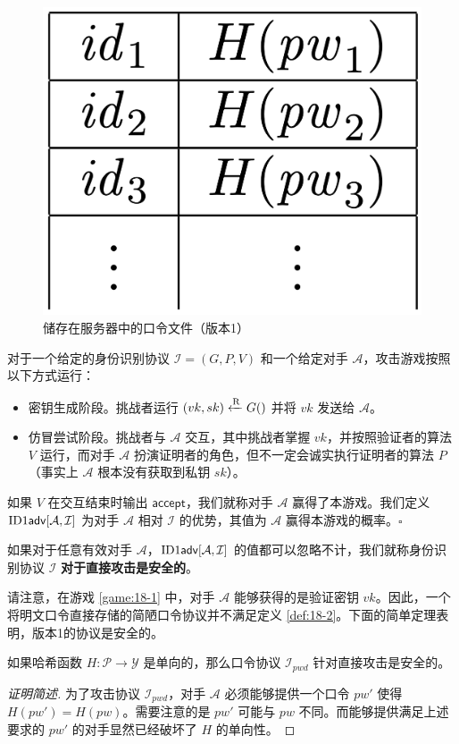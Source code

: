 \begin{figure}
    \centering
    \includegraphics[width=0.17\linewidth]{figures/chapter18/fig2.png}
    \caption{储存在服务器中的口令文件（版本1）}
    \label{fig:18-2}
\end{figure}

\begin{game}[针对直接攻击安全的身份识别]\label{game:18-1}
对于一个给定的身份识别协议 $\mathcal{I}=(G,P,V)$ 和一个给定对手 $\mathcal{A}$，攻击游戏按照以下方式运行：
\begin{itemize}
    \item 密钥生成阶段。挑战者运行 $(vk,sk)\xleftarrow{\rm R} G()$ 并将 $vk$ 发送给 $\mathcal{A}$。
    \item 仿冒尝试阶段。挑战者与 $\mathcal{A}$ 交互，其中挑战者掌握 $vk$，并按照验证者的算法 $V$ 运行，而对手 $\mathcal{A}$ 扮演证明者的角色，但不一定会诚实执行证明者的算法 $P$（事实上 $\mathcal{A}$ 根本没有获取到私钥 $sk$）。
\end{itemize}
如果 $V$ 在交互结束时输出 $\mathsf{accept}$，我们就称对手 $\mathcal{A}$ 赢得了本游戏。我们定义 $\rm{ID1\mathsf{adv}}[\mathcal{A},\mathcal{I}]$ 为对手 $\mathcal{A}$ 相对 $\mathcal{I}$ 的优势，其值为 $\mathcal{A}$ 赢得本游戏的概率。{\hfill $\square$}
\end{game}

\begin{definition}\label{def:18-2}
如果对于任意有效对手 $\mathcal{A}$，$\rm{ID1\mathsf{adv}}[\mathcal{A},\mathcal{I}]$ 的值都可以忽略不计，我们就称身份识别协议 $\mathcal{I}$ \textbf{对于直接攻击是安全的}。
\end{definition}

请注意，在游戏 \ref{game:18-1} 中，对手 $\mathcal{A}$ 能够获得的是验证密钥 $vk$。因此，一个将明文口令直接存储的简陋口令协议并不满足定义 \ref{def:18-2}。下面的简单定理表明，版本1的协议是安全的。

\begin{theorem}\label{theo:18-1}
如果哈希函数 $H:\mathcal{P}\to\mathcal{Y}$ 是单向的，那么口令协议 $\mathcal{I}_{pwd}$ 针对直接攻击是安全的。
\end{theorem}

\begin{proof}[证明简述]
为了攻击协议 $\mathcal{I}_{pwd}$，对手 $\mathcal{A}$ 必须能够提供一个口令 $pw'$ 使得 $H(pw')=H(pw)$。需要注意的是 $pw'$ 可能与 $pw$ 不同。而能够提供满足上述要求的 $pw'$ 的对手显然已经破坏了 $H$ 的单向性。
\end{proof}


